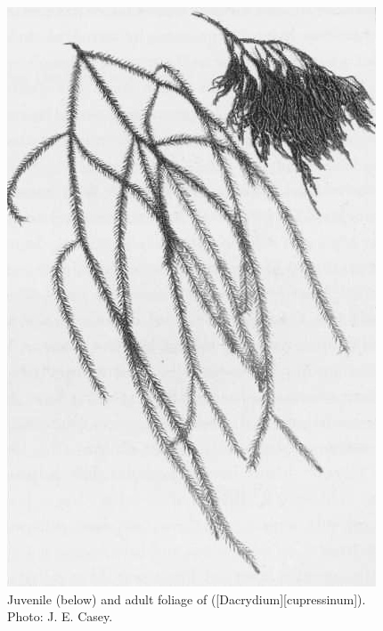\begin{figure}[t]
	\begin{minipage}[t]{\textwidth}
		\begin{minipage}[t]{(\textwidth-\fgap) * \real{0.503}}
			\centering
			\includegraphics[width=\textwidth]{graphics/figure21rimu.jpg}
			\caption[Rimu foliage]{Juvenile (below) and adult foliage of  ([Dacrydium][cupressinum]).
			Photo: J. E. Casey.}%
			\label{fig:21rimu}
		\end{minipage}\hspace{\fgap}%
		\begin{minipage}[t]{(\textwidth-\fgap) * \real{0.497}}

\end{minipage}
\end{minipage}
\end{figure}
